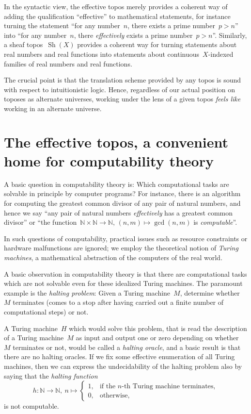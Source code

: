 \documentclass[oneside,reqno]{amsart}
\theoremstyle{definition}
\theoremstyle{plain}
\theoremstyle{remark}
\newcommand{\NN}{\mathbb{N}}
\DeclareMathOperator{\Sh}{Sh}
\renewcommand{\_}{\mathpunct{.}\,}
\newcommand{\effective}{ef{}fective\xspace}
\newcommand{\effectively}{ef{}fectively\xspace}
\newcommand{\?}{\,{:}\,}
\begin{document}
In the syntactic view, the \effective topos merely provides a coherent way of
adding the qualification ``\effective'' to mathematical statements, for
instance turning the statement ``for any number~$n$, there exists a prime number~$p
> n$'' into ``for any number~$n$, there \emph{\effectively} exists a prime
number~$p > n$''. Similarly, a sheaf topos~$\Sh(X)$ provides a coherent way for
turning statements about real numbers and real functions into statements about
continuous~$X$-indexed families of real numbers and real functions.

The crucial point is that the translation scheme provided by any topos is sound
with respect to intuitionistic logic. Hence, regardless of our actual position
on toposes as alternate universes, working under the lens of a given topos
\emph{feels like} working in an alternate universe.


\section{The \effective topos, a convenient home for computability theory}
\label{sect:effective-topos}

A basic question in computability theory is: Which computational tasks are
solvable in principle by computer programs? For instance, there is an algorithm
for computing the greatest common divisor of any pair of natural numbers, and
hence we say ``any pair of natural numbers \emph{\effectively} has a greatest
common divisor''  or ``the function~$\NN \times \NN \to \NN,\,(n,m) \mapsto
\operatorname{gcd}(n,m)$ is \emph{computable}''.

In such questions of computability, practical issues such as resource
constraints or hardware malfunctions are ignored; we employ the theoretical
notion of \emph{Turing machines}, a mathematical abstraction of the computers
of the real world.

A basic observation in computability theory is that there are computational tasks
which are not solvable even for these idealized Turing machines. The paramount
example is the \emph{halting problem}: Given a Turing machine~$M$, determine
whether~$M$ terminates (comes to a stop after having carried out a finite
number of computational steps) or not.

A Turing machine~$H$ which would solve this problem, that is read the
description of a Turing machine~$M$ as input and output one or zero depending
on whether~$M$ terminates or not, would be called a \emph{halting oracle}, and
a basic result is that there are no halting oracles. If we fix some \effective
enumeration of all Turing machines, then we can express the undecidability of
the halting problem also by saying that the \emph{halting function}
\[ h : \NN \longrightarrow \NN,\ n \longmapsto \begin{cases}
  1, & \text{if the~$n$-th Turing machine terminates}, \\
  0, & \text{otherwise,}
\end{cases} \]
is not computable.
\end{document}
